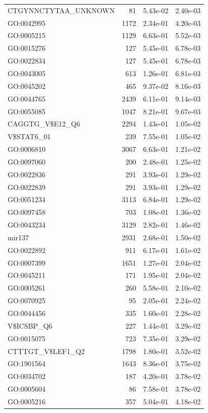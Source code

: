 \documentclass[]{article}
\begin{document}
\begin{table}[H]
\begin{tabular}{|l|rrr|}
CTGYNNCTYTAA\_UNKNOWN & 81 & 5.43e-02 & 2.40e-03\\
GO:0042995 & 1172 & 2.34e-01 & 4.20e-03\\
GO:0005215 & 1129 & 6.63e-01 & 5.52e-03\\
GO:0015276 & 127 & 5.45e-01 & 6.78e-03\\
GO:0022834 & 127 & 5.45e-01 & 6.78e-03\\
GO:0043005 & 613 & 1.26e-01 & 6.81e-03\\
GO:0045202 & 465 & 9.37e-02 & 8.16e-03\\
GO:0044765 & 2439 & 6.11e-01 & 9.14e-03\\
GO:0055085 & 1047 & 8.21e-01 & 9.67e-03\\
CAGGTG\_V\$E12\_Q6 & 2294 & 1.43e-01 & 1.05e-02\\
V\$STAT6\_01 & 239 & 7.55e-01 & 1.05e-02\\
GO:0006810 & 3067 & 6.63e-01 & 1.21e-02\\
GO:0097060 & 200 & 2.48e-01 & 1.25e-02\\
GO:0022836 & 291 & 3.93e-01 & 1.29e-02\\
GO:0022839 & 291 & 3.93e-01 & 1.29e-02\\
GO:0051234 & 3113 & 6.84e-01 & 1.29e-02\\
GO:0097458 & 703 & 1.08e-01 & 1.36e-02\\
GO:0043234 & 3129 & 2.82e-01 & 1.46e-02\\
mir137 & 2931 & 2.68e-01 & 1.50e-02\\
GO:0022892 & 911 & 6.17e-01 & 1.61e-02\\
GO:0007399 & 1651 & 1.27e-01 & 2.04e-02\\
GO:0045211 & 171 & 1.95e-01 & 2.04e-02\\
GO:0005261 & 260 & 5.58e-01 & 2.10e-02\\
GO:0070925 & 95 & 2.05e-01 & 2.24e-02\\
GO:0044456 & 335 & 1.60e-01 & 2.28e-02\\
V\$ICSBP\_Q6 & 227 & 1.44e-01 & 3.29e-02\\
GO:0015075 & 723 & 7.35e-01 & 3.29e-02\\
CTTTGT\_V\$LEF1\_Q2 & 1798 & 1.80e-01 & 3.52e-02\\
GO:1901564 & 1643 & 8.36e-01 & 3.75e-02\\
GO:0034702 & 187 & 4.20e-01 & 3.78e-02\\
GO:0005604 & 86 & 7.58e-01 & 3.78e-02\\
GO:0005216 & 357 & 5.04e-01 & 4.18e-02\\

\end{tabular}
\end{table}
\end{document}
